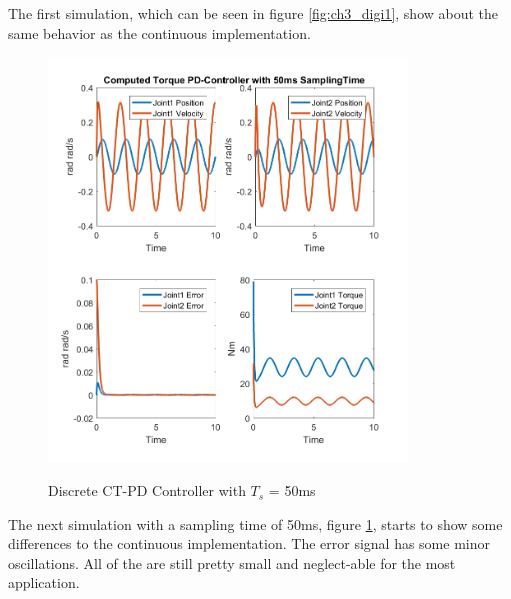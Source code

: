 The first simulation, which can be seen in figure \ref{fig:ch3_digi1}, show about the same behavior as the continuous implementation. 
\begin{figure}[h]
	\centering
	\includegraphics[width=0.85\textwidth]{pics/ComputedTorquePD-Controllerwith50msSamplingTime.png}\\
	\caption{Discrete CT-PD Controller with $T_s$ = 50ms}
	\label{fig:ch3_digi2}
\end{figure}
 The next simulation with a sampling time of 50ms, figure \ref{fig:ch3_digi2}, starts to show some differences to the continuous implementation. The error signal has some minor oscillations. All of the are still pretty small and neglect-able for the most application. 

